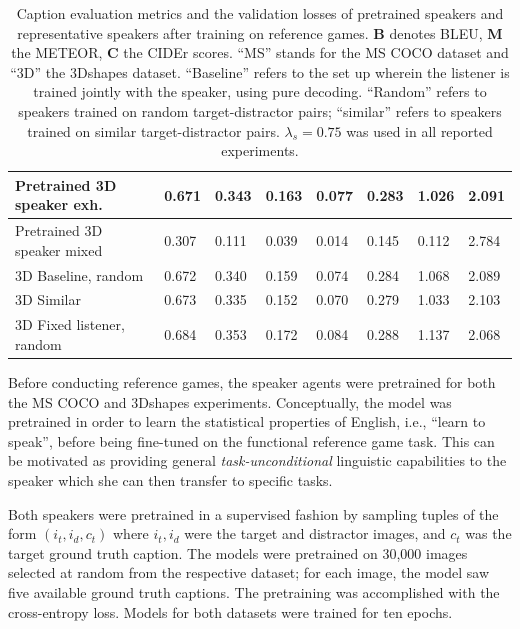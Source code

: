\begin{table}[]
\begin{tabularx}{\textwidth}{|X|l|l|l|l|l|l|l|}
		Pretrained 3D speaker exh.    & 0.671           & 0.343           & 0.163           & 0.077           & 0.283           & 1.026          & 2.091                    \\ \hline
		Pretrained 3D speaker mixed    &  0.307          &  0.111  &  0.039     & 0.014       &  0.145   &    0.112 &    2.784      \\ \hline
		3D Baseline, random  & 0.672           & 0.340           & 0.159           & 0.074           & 0.284           & 1.068          & 2.089                    \\ \hline
		3D Similar & 0.673           & 0.335           & 0.152           & 0.070           & 0.279           & 1.033          & 2.103                    \\ \hline
		3D Fixed listener, random &      0.684           &   0.353      &    0.172       &     0.084   &      0.288   &     1.137  &     2.068        \\ \hline
	\end{tabularx}
\caption{\label{tab:eval_metrics_refgame}Caption evaluation metrics and the validation losses of pretrained speakers and representative speakers after training on reference games. \textbf{B} denotes BLEU, \textbf{M} the METEOR, \textbf{C} the CIDEr scores. ``MS'' stands for the MS COCO dataset and ``3D'' the 3Dshapes dataset. ``Baseline'' refers to the set up wherein the listener is trained jointly with the speaker, using pure decoding. ``Random'' refers to speakers trained on random target-distractor pairs; ``similar'' refers to speakers trained on similar target-distractor pairs. $\lambda_s = 0.75$ was used in all reported experiments.}
\end{table}

Before conducting reference games, the speaker agents were pretrained for both the MS COCO and 3Dshapes experiments. Conceptually, the model was pretrained in order to learn the statistical properties of English, i.e., ``learn to speak'', before being fine-tuned on the functional reference game task. This can be motivated as providing general \textit{task-unconditional} linguistic capabilities to the speaker which she can then transfer to specific tasks.

Both speakers were pretrained in a supervised fashion by sampling tuples of the form $(i_t, i_d, c_t)$ where $i_t, i_d$ were the target and distractor images, and $c_t$ was the target ground truth caption. The models were pretrained on 30,000 images selected at random from the respective dataset; for each image, the model saw five available ground truth captions. 
The pretraining was accomplished with the cross-entropy loss. Models for both datasets were trained for ten epochs.

